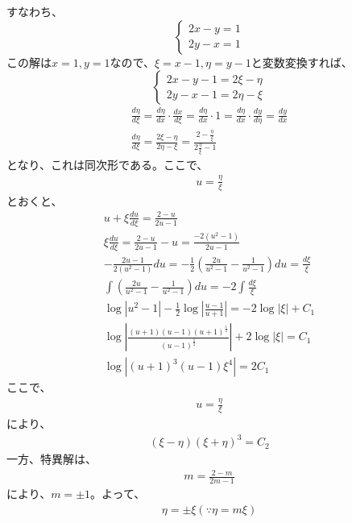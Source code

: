 \documentclass{jsarticle}
\begin{document}
すなわち、
\begin{displaymath}
\left\{
\begin{array}{l}
2x-y=1 \\
2y-x=1
\end{array}
\right.
\end{displaymath}
この解は$x=1,y=1$なので、$\xi = x-1,\eta = y-1$と変数変換すれば、
\begin{displaymath}
\left\{
\begin{array}{l}
2x-y-1=2\xi - \eta  \\
2y-x-1=2\eta - \xi
\end{array}
\right.
\end{displaymath}
\begin{eqnarray}
\frac{d\eta}{d\xi}=\frac{d\eta}{dx}\cdot \frac{dx}{d\xi} =\frac{d\eta}{dx}\cdot 1=\frac{d\eta}{dx}\cdot \frac{dy}{d\eta}=\frac{dy}{dx}\\
\frac{d\eta}{d\xi}=\frac{2\xi-\eta}{2\eta-\xi}=\frac{2-\frac{\eta}{\xi}}{2\frac{\eta}{\xi}-1}
\end{eqnarray}
となり、これは同次形である。ここで、
\begin{eqnarray}
u=\frac{\eta}{\xi}
\end{eqnarray}
とおくと、
\begin{eqnarray}
u+\xi\frac{du}{d\xi}=\frac{2-u}{2u-1}\\
\xi \frac{du}{d\xi}=\frac{2-u}{2u-1}-u=\frac{-2(u^2-1)}{2u-1}\\
-\frac{2u-1}{2(u^2-1)}du=-\frac{1}{2}\left(\frac{2u}{u^2-1}-\frac{1}{u^2-1}\right)du=\frac{d\xi}{\xi}\\
\int \left(\frac{2u}{u^2-1}-\frac{1}{u^2-1}\right)du=-2\int \frac{d\xi}{\xi}\\
\log |u^2-1|-\frac{1}{2}\log \left|\frac{u-1}{u+1}\right|=-2\log|\xi|+C_1\\
\log \left|\frac{(u+1)(u-1)(u+1)^{\frac{1}{2}}}{(u-1)^{\frac{1}{2}}}\right|+2\log |\xi|=C_1\\
\log|(u+1)^3(u-1)\xi ^4|=2C_1
\end{eqnarray}
ここで、
\begin{eqnarray}
u=\frac{\eta}{\xi}
\end{eqnarray}
により、
\begin{eqnarray}
(\xi-\eta)(\xi+\eta)^3=C_2
\end{eqnarray}
一方、特異解は、
\begin{eqnarray}
m=\frac{2-m}{2m-1}
\end{eqnarray}
により、$m=\pm 1$。よって、
\begin{eqnarray}
\eta = \pm \xi (\because \eta = m\xi)
\end{eqnarray}
\end{document}
